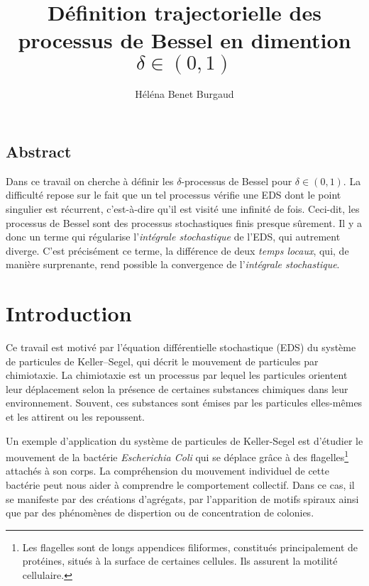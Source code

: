 \documentclass[openany]{book}
\title{Définition trajectorielle des processus de Bessel en dimention $\delta \in (0,1)$}
\author{Héléna Benet Burgaud}
\newcommand{\1}{\mathbbm{1}}
\theoremstyle{thmfont}
\theoremstyle{deffont}
\theoremstyle{thmfont}
\theoremstyle{deffont}
\begin{document}

\maketitle
\tableofcontents
\clearpage
{} %
\setcounter{page}{1}


{\let\clearpage\relax
  
  \section*{Abstract}
  Dans ce travail on cherche à définir les $\delta$-processus de Bessel pour $\delta \in (0,1)$. La difficulté repose sur le fait que un tel processus vérifie une EDS dont le point singulier est récurrent, c'est-à-dire qu'il est visité une infinité de fois. Ceci-dit, les processus de Bessel sont des processus stochastiques finis presque sûrement. Il y a donc un terme qui régularise l'\textit{intégrale stochastique} de l'EDS, qui autrement diverge. C’est précisément ce terme, la différence de deux \textit{temps locaux}, qui, de manière surprenante, rend possible la convergence de l’\textit{intégrale stochastique}.
  
\chapter*{Introduction}

Ce travail est motivé par l’équation différentielle stochastique (EDS) du système de particules de Keller--Segel, qui décrit le mouvement de particules par chimiotaxie. La chimiotaxie est un processus par lequel les particules orientent leur déplacement selon la présence de certaines substances chimiques dans leur environnement. Souvent, ces substances sont émises par les particules elles-mêmes et les attirent ou les repoussent.

Un exemple d'application du système de particules de Keller-Segel est d'étudier le mouvement de la bactérie \textit{Escherichia Coli} qui se déplace grâce à des flagelles\footnote{Les flagelles sont de longs appendices filiformes, constitués principalement de protéines, situés à la surface de certaines cellules. Ils assurent la motilité cellulaire.} attachés à son corps. La compréhension du mouvement individuel de cette bactérie peut nous aider à comprendre le comportement collectif. Dans ce cas, il se manifeste par des créations d'agrégats, par l'apparition de motifs spiraux ainsi que par des phénomènes de dispertion ou de concentration de colonies.

}
\end{document}
